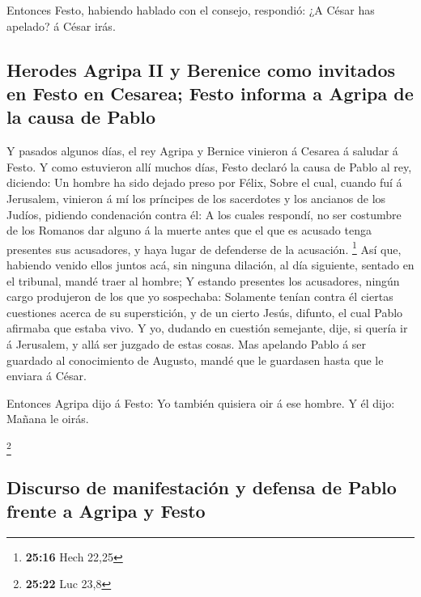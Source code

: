  Entonces Festo, habiendo hablado con el consejo,
respondió: ¿A César has apelado? á César irás.

\hypertarget{herodes-agripa-ii-y-berenice-como-invitados-en-festo-en-cesarea-festo-informa-a-agripa-de-la-causa-de-pablo}{%
\subsection{Herodes Agripa II y Berenice como invitados en Festo en
Cesarea; Festo informa a Agripa de la causa de
Pablo}\label{herodes-agripa-ii-y-berenice-como-invitados-en-festo-en-cesarea-festo-informa-a-agripa-de-la-causa-de-pablo}}

 Y pasados algunos días, el rey Agripa y Bernice vinieron
á Cesarea á saludar á Festo.  Y como estuvieron allí
muchos días, Festo declaró la causa de Pablo al rey, diciendo: Un hombre
ha sido dejado preso por Félix,  Sobre el cual, cuando
fuí á Jerusalem, vinieron á mí los príncipes de los sacerdotes y los
ancianos de los Judíos, pidiendo condenación contra él: 
A los cuales respondí, no ser costumbre de los Romanos dar alguno á la
muerte antes que el que es acusado tenga presentes sus acusadores, y
haya lugar de defenderse de la acusación. \footnote{\textbf{25:16} Hech
  22,25}  Así que, habiendo venido ellos juntos acá, sin
ninguna dilación, al día siguiente, sentado en el tribunal, mandé traer
al hombre;  Y estando presentes los acusadores, ningún
cargo produjeron de los que yo sospechaba:  Solamente
tenían contra él ciertas cuestiones acerca de su superstición, y de un
cierto Jesús, difunto, el cual Pablo afirmaba que estaba vivo.
 Y yo, dudando en cuestión semejante, dije, si quería ir
á Jerusalem, y allá ser juzgado de estas cosas.  Mas
apelando Pablo á ser guardado al conocimiento de Augusto, mandé que le
guardasen hasta que le enviara á César.

 Entonces Agripa dijo á Festo: Yo también quisiera oir á
ese hombre. Y él dijo: Mañana le oirás.

\footnote{\textbf{25:22} Luc 23,8}

\hypertarget{discurso-de-manifestaciuxf3n-y-defensa-de-pablo-frente-a-agripa-y-festo}{%
\subsection{Discurso de manifestación y defensa de Pablo frente a Agripa
y
Festo}\label{discurso-de-manifestaciuxf3n-y-defensa-de-pablo-frente-a-agripa-y-festo}}


